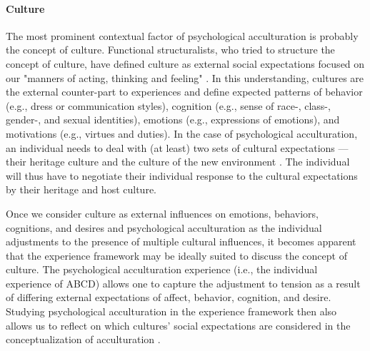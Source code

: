 \documentclass[nobib]{tufte-handout}
\begin{document}
\paragraph{Culture}
The most prominent contextual factor of psychological acculturation is probably the concept of culture. Functional structuralists, who tried to structure the concept of culture, have defined culture as external social expectations focused on our "manners of acting, thinking and feeling" \citep[][p. 52; on social facts]{Durkheim1982}. In this understanding, cultures are the external counter-part to experiences and define expected patterns of behavior (e.g., dress or communication styles), cognition (e.g., sense of race-, class-, gender-, and sexual identities), emotions (e.g., expressions of emotions), and motivations (e.g., virtues and duties). In the case of psychological acculturation, an individual needs to deal with (at least) two sets of cultural expectations --- their heritage culture and the culture of the new environment \citep[e.g., see models of][]{Berry1997b, Berry2006a}. The individual will thus have to negotiate their individual response to the cultural expectations by their heritage and host culture.

Once we consider culture as external influences on emotions, behaviors, cognitions, and desires and psychological acculturation as the individual adjustments to the presence of multiple cultural influences, it becomes apparent that the experience framework may be ideally suited to discuss the concept of culture. The psychological acculturation experience (i.e., the individual experience of ABCD) allows one to capture the adjustment to tension as a result of differing external expectations of affect, behavior, cognition, and desire. Studying psychological acculturation in the experience framework then also allows us to reflect on which cultures' social expectations are considered in the conceptualization of acculturation \citep{Bhatia2001}. 
\end{document}

